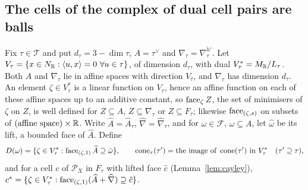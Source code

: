 \subsection{The cells of the complex of dual cell pairs are balls}\label{app:leg-balls}
Fix $\tau\in\mathcal T$ and put $d_\tau=3-\dim\tau$, $A=\tau^\vee$ and $\nabla_\tau=\nabla^{\check h'}_\tau$. Let
$V_\tau=\{x\in N_\R:\langle u,x\rangle=0\ \forall u\in\tau\}$, of dimension $d_\tau$, with dual $V_\tau^*=M_\mathbb R/L_\tau$. Both
$A$ and $\nabla_\tau$ lie in affine spaces with direction $V_\tau$, and $\nabla_\tau$ has dimension $d_\tau$. An element
$\zeta\in V_\tau^*$ is a linear function on $V_\tau$, hence an affine function on each of these affine spaces up to an
additive constant, so $\operatorname{face}_\zeta Z$, the set of minimisers of $\zeta$ on $Z$, is well defined for $Z\subseteq A$,
$Z\subseteq\nabla_\tau$ or $Z\subseteq F_\tau$; likewise $\operatorname{face}_{(\zeta,s)}$ on subsets of $(\text{affine space})\times\mathbb R$.
Write $\widehat A=\widehat A_\tau$, $\widehat\nabla=\widehat\nabla_\tau$, and for $\omega\in\mathcal F$, $\omega\subseteq A$,
let $\hat\omega$ be its lift, a bounded face of $\widehat A$. Define
\[
D(\omega)=\{\zeta\in V_\tau^*:\operatorname{face}_{(\zeta,1)}\widehat A\supseteq\hat\omega\},\qquad
\operatorname{cone}_\tau(\tau')=\text{the image of }\operatorname{cone}(\tau')\text{ in }V_\tau^*\quad(\tau'\supseteq\tau),
\]
and for a cell $c$ of $\mathscr P_X$ in $F_\tau$ with lifted face $\hat c$ (Lemma~\ref{lem:cayley}),
$c^*=\{\zeta\in V_\tau^*:\operatorname{face}_{(\zeta,1)}(\widehat A+\widehat\nabla)\supseteq\hat c\}$.

